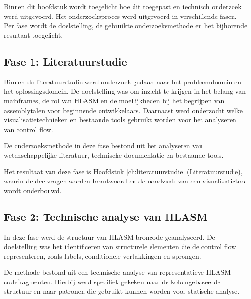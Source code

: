 
\chapter{}%
\label{ch:methodologie}

Binnen dit hoofdstuk wordt toegelicht hoe dit toegepast en technisch onderzoek werd uitgevoerd. Het onderzoeksproces werd uitgevoerd in verschillende fasen. Per fase wordt de doelstelling, de gebruikte onderzoeksmethode en het bijhorende resultaat toegelicht. 


\section{Fase 1: Literatuurstudie}

Binnen de literatuurstudie werd onderzoek gedaan naar het probleemdomein en het oplossingsdomein. De doelstelling was om inzicht te krijgen in het belang van mainframes, de rol van HLASM en de moeilijkheden bij het begrijpen van assemblytalen voor beginnende ontwikkelaars. Daarnaast werd onderzocht welke visualisatietechnieken en bestaande tools gebruikt worden voor het analyseren van control flow. 

De onderzoeksmethode in deze fase bestond uit het analyseren van wetenschappelijke literatuur, technische documentatie en bestaande tools. 

Het resultaat van deze fase is Hoofdstuk \ref{ch:literatuurstudie} (Literatuurstudie), waarin de deelvragen worden beantwoord en de noodzaak van een visualisatietool wordt onderbouwd.

\section{Fase 2: Technische analyse van HLASM}

In deze fase werd de structuur van HLASM-broncode geanalyseerd.  De doelstelling was het identificeren van structurele elementen die de control flow representeren, zoals labels, conditionele vertakkingen en sprongen.

De methode bestond uit een technische analyse van representatieve HLASM-codefragmenten. Hierbij werd specifiek gekeken naar de kolomgebaseerde structuur en naar patronen die gebruikt kunnen worden voor statische analyse.

